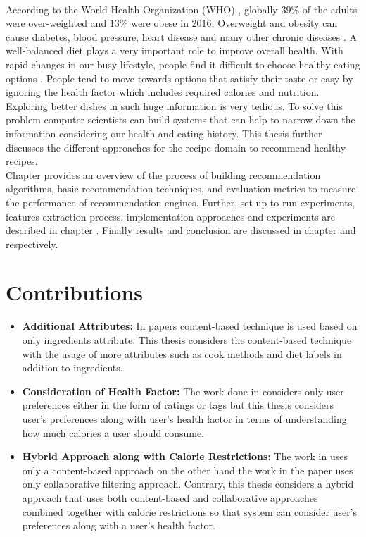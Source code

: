 \\
According to the World Health Organization (WHO) \cite{42}, globally $39\%$ of the adults were over-weighted and $13\%$ were obese in 2016. Overweight and obesity can cause diabetes, blood pressure, heart disease and many other chronic diseases \cite{43}. A well-balanced diet plays a very important role to improve overall health. With rapid changes in our busy lifestyle, people find it difficult to choose healthy eating options \cite{13}. People tend to move towards options that satisfy their taste or easy by ignoring the health factor which includes required calories and nutrition. Exploring better dishes in such huge information is very tedious. To solve this problem computer scientists can build systems that can help to narrow down the information considering our health and eating history. This thesis further discusses the different approaches for the recipe domain to recommend healthy recipes.
\\
Chapter  provides an overview of the process of building recommendation algorithms, basic recommendation techniques, and evaluation metrics to measure the performance of recommendation engines. Further, set up to run experiments, features extraction process, implementation approaches and experiments are described in chapter . Finally results and conclusion are discussed in chapter  and  respectively.

\section{Contributions}
\begin{itemize}
\item \textbf{Additional Attributes:} In papers \cite{13,15} content-based technique is used based on only ingredients attribute. This thesis considers the content-based technique with the usage of more attributes such as cook methods and diet labels in addition to ingredients.
\item \textbf{Consideration of Health Factor:} The work done in \cite{13,15,16} considers only user preferences either in the form of ratings or tags but this thesis considers user's preferences along with user's health factor in terms of understanding how much calories a user should consume.
\item \textbf{Hybrid Approach along with Calorie Restrictions:} The work in \cite{13,15} uses only a content-based approach on the other hand the work in the paper \cite{16} uses only collaborative filtering approach. Contrary, this thesis considers a hybrid approach that uses both content-based and collaborative approaches combined together with calorie restrictions so that system can consider user's preferences along with a user's health factor.
\end{itemize}
\pagebreak


